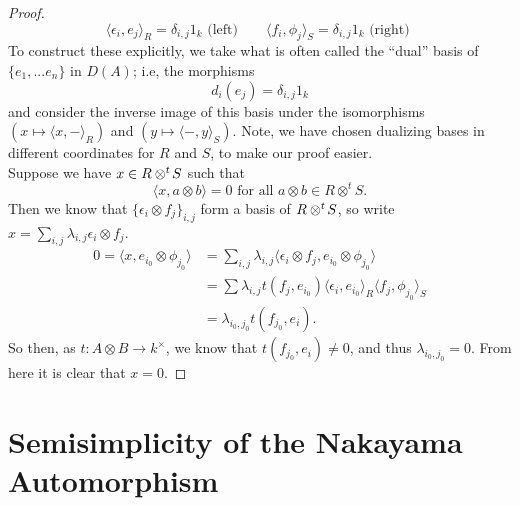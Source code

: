 \documentclass{article}
\newcommand{\twisten}{\otimes^t\hspace{-1pt}}
\theoremstyle{plain}
\theoremstyle{definition}
\begin{document}
\begin{proof}
$$\langle \epsilon_i, e_j \rangle_R = \delta_{i,j}1_k \textrm{ (left) } \hspace{20pt} \langle f_i, \phi_j \rangle_S = \delta_{i,j}1_k \textrm{ (right) }$$
To construct these explicitly, we take what is often called the ``dual'' basis of $\{e_1,...e_n\}$ in $D(A)$; i.e, the morphisms
$$d_i(e_j) = \delta_{i,j} 1_k$$
and consider the inverse image of this basis under the isomorphisms $(x \mapsto \langle x, - \rangle_R)$ and $(y \mapsto \langle - , y \rangle_S)$. Note, we have chosen dualizing bases in different coordinates for $R$ and $S$, to make our proof easier. \\[5pt]
Suppose we have $x \in R \twisten S$ such that
$$\langle  x, a \otimes b \rangle = 0 \textrm{ for all } a\otimes b \in R\otimes^t S.$$
Then we know that $\{ \epsilon_i \otimes f_j \}_{i,j}$ form a basis of $R \twisten S$, so write $x = \sum_{i,j} \lambda_{i,j} \epsilon_i \otimes f_j$.
\begin{align*}0= \langle x, e_{i_0} \otimes \phi_{j_0} \rangle&= \sum_{i,j}\lambda_{i,j}\langle \epsilon_i \otimes f_j, e_{i_0} \otimes \phi_{j_0} \rangle \\
&= \sum \lambda_{i,j} t(f_j, e_{i_0})\langle\epsilon_i, e_{i_0}\rangle_R \langle f_j, \phi_{j_0} \rangle_S \\
&= \lambda_{i_0,j_0}t(f_{j_0}, e_i).
\end{align*}
So then, as $t: A \otimes B \rightarrow k^{\times}$, we know that $t(f_{j_0}, e_i)\not=0$, and thus $\lambda_{i_0,j_0}=0$. From here it is clear that $x=0$.
\end{proof}
\section{Semisimplicity of the Nakayama Automorphism}
\end{document}

